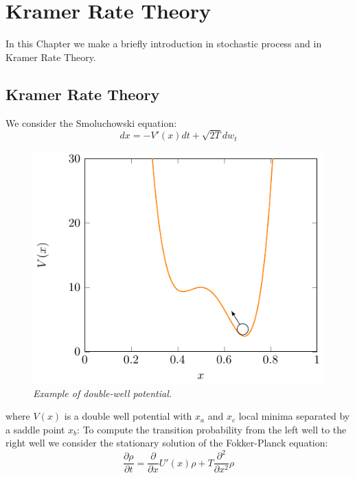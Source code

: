 \chapter{Kramer Rate Theory}\label{kramer}
\lhead[\fancyplain{}{\bfseries\thepage}]{\fancyplain{}{\bfseries\rightmark}}
In this Chapter we make a briefly introduction in stochastic process and in Kramer Rate Theory.
\section{Kramer Rate Theory}
We consider the Smoluchowski equation:
\begin{equation}
dx = -V'(x)dt + \sqrt{2T} dw_t
\end{equation}

\begin{figure}
\centering
\includegraphics[scale=1.2]{images/kramerwell.pdf}
\caption{\emph{Example of double-well potential.}}
\label{fig:kr}


\end{figure}
where $V(x)$ is a double well potential with $x_a$ and $x_c$ local minima separated by a saddle point $x_b$: To compute the transition probability from the left well to the right well we consider the stationary solution of the Fokker-Planck equation:
\begin{equation}
\frac{\partial \rho}{\partial t } = \frac{\partial}{\partial x} U'(x)\rho + T \frac{\partial ^2 }{\partial x^2} \rho
\end{equation}


